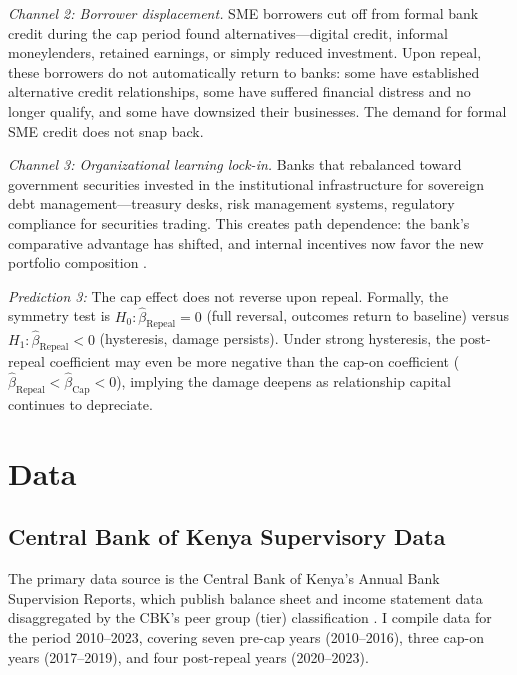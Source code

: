 \documentclass[12pt]{article}
\begin{document}
\textit{Channel 2: Borrower displacement.} SME borrowers cut off from formal bank credit during the cap period found alternatives---digital credit, informal moneylenders, retained earnings, or simply reduced investment. Upon repeal, these borrowers do not automatically return to banks: some have established alternative credit relationships, some have suffered financial distress and no longer qualify, and some have downsized their businesses. The demand for formal SME credit does not snap back.

\textit{Channel 3: Organizational learning lock-in.} Banks that rebalanced toward government securities invested in the institutional infrastructure for sovereign debt management---treasury desks, risk management systems, regulatory compliance for securities trading. This creates path dependence: the bank's comparative advantage has shifted, and internal incentives now favor the new portfolio composition \citep{hannan1984structural}.

\textit{Prediction 3:} The cap effect does not reverse upon repeal. Formally, the symmetry test is $H_0: \hat{\beta}_{\text{Repeal}} = 0$ (full reversal, outcomes return to baseline) versus $H_1: \hat{\beta}_{\text{Repeal}} < 0$ (hysteresis, damage persists). Under strong hysteresis, the post-repeal coefficient may even be more negative than the cap-on coefficient ($\hat{\beta}_{\text{Repeal}} < \hat{\beta}_{\text{Cap}} < 0$), implying the damage deepens as relationship capital continues to depreciate.


\section{Data}
\label{sec:data}

\subsection{Central Bank of Kenya Supervisory Data}

The primary data source is the Central Bank of Kenya's Annual Bank Supervision Reports, which publish balance sheet and income statement data disaggregated by the CBK's peer group (tier) classification \citep{cbk2017, cbk2019}. I compile data for the period 2010--2023, covering seven pre-cap years (2010--2016), three cap-on years (2017--2019), and four post-repeal years (2020--2023).
\end{document}
